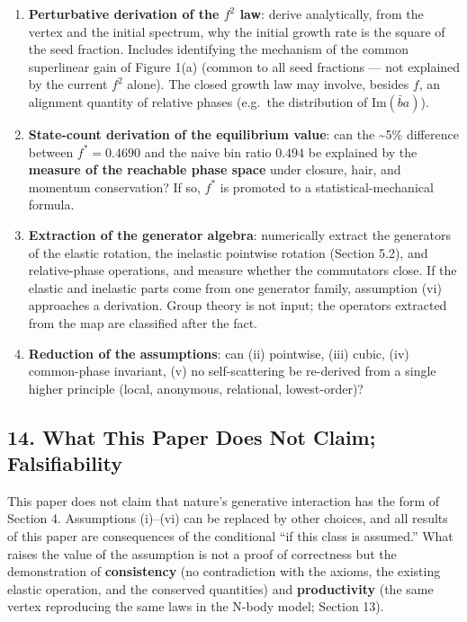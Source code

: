 \documentclass[
  a4paper,
]{article}
\providecommand{\tightlist}{%
  \setlength{\itemsep}{0pt}\setlength{\parskip}{0pt}}
\begin{document}
\begin{enumerate}
\def\labelenumi{\arabic{enumi}.}
\tightlist
\item
  \textbf{Perturbative derivation of the \(f^2\) law}: derive
  analytically, from the vertex and the initial spectrum, why the
  initial growth rate is the square of the seed fraction. Includes
  identifying the mechanism of the common superlinear gain of Figure
  1(a) (common to all seed fractions --- not explained by the current
  \(f^2\) alone). The closed growth law may involve, besides \(f\), an
  alignment quantity of relative phases (e.g.~the distribution of
  \(\mathrm{Im}(\bar b a)\)).
\item
  \textbf{State-count derivation of the equilibrium value}: can the
  \textasciitilde5\% difference between \(f^*=0.4690\) and the naive bin
  ratio \(0.494\) be explained by the \textbf{measure of the reachable
  phase space} under closure, hair, and momentum conservation? If so,
  \(f^*\) is promoted to a statistical-mechanical formula.
\item
  \textbf{Extraction of the generator algebra}: numerically extract the
  generators of the elastic rotation, the inelastic pointwise rotation
  (Section 5.2), and relative-phase operations, and measure whether the
  commutators close. If the elastic and inelastic parts come from one
  generator family, assumption (vi) approaches a derivation. Group
  theory is not input; the operators extracted from the map are
  classified after the fact.
\item
  \textbf{Reduction of the assumptions}: can (ii) pointwise, (iii)
  cubic, (iv) common-phase invariant, (v) no self-scattering be
  re-derived from a single higher principle (local, anonymous,
  relational, lowest-order)?
\end{enumerate}

\subsection{14. What This Paper Does Not Claim;
Falsifiability}\label{what-this-paper-does-not-claim-falsifiability}

This paper does not claim that nature's generative interaction has the
form of Section 4. Assumptions (i)--(vi) can be replaced by other
choices, and all results of this paper are consequences of the
conditional ``if this class is assumed.'' What raises the value of the
assumption is not a proof of correctness but the demonstration of
\textbf{consistency} (no contradiction with the axioms, the existing
elastic operation, and the conserved quantities) and
\textbf{productivity} (the same vertex reproducing the same laws in the
N-body model; Section 13).
\end{document}
